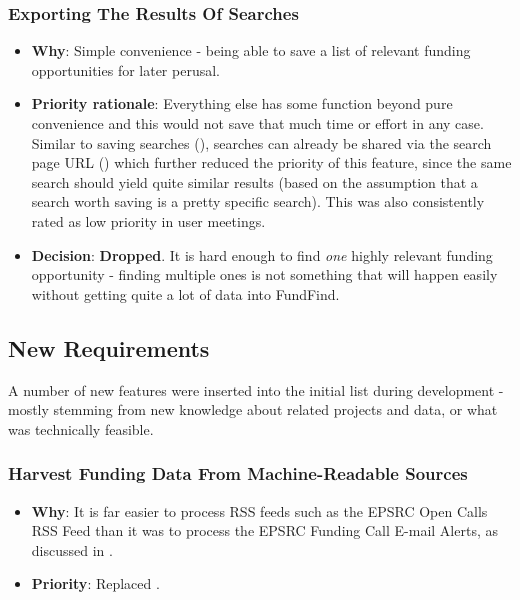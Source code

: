 \subsubsection{Exporting The Results Of Searches}
\begin{itemize}
 \item \textbf{Why}: Simple convenience - being able to save a list of relevant funding opportunities for later perusal.
 \item \textbf{Priority rationale}: Everything else has some function beyond pure convenience and this would not save that much time or effort in any case. Similar to saving searches (), searches can already be shared via the search page URL () which further reduced the priority of this feature, since the same search should yield quite similar results (based on the assumption that a search worth saving is a pretty specific search). This was also consistently rated as low priority in user meetings.
 \item \textbf{Decision}: \textbf{Dropped}. It is hard enough to find \emph{one} highly relevant funding opportunity - finding multiple ones is not something that will happen easily without getting quite a lot of data into FundFind.
\end{itemize}

\subsection{New Requirements}
\label{new-reqs}
A number of new features were inserted into the initial list during development - mostly stemming from new knowledge about related projects and data, or what was technically feasible.

\subsubsection{Harvest Funding Data From Machine-Readable Sources}
\begin{itemize}
 \item \textbf{Why}: It is far easier to process RSS feeds such as the EPSRC Open Calls RSS Feed \cite{epsrc-rss} than it was to process the EPSRC Funding Call E-mail Alerts, as discussed in .
 \item \textbf{Priority}: Replaced .
\end{itemize}

